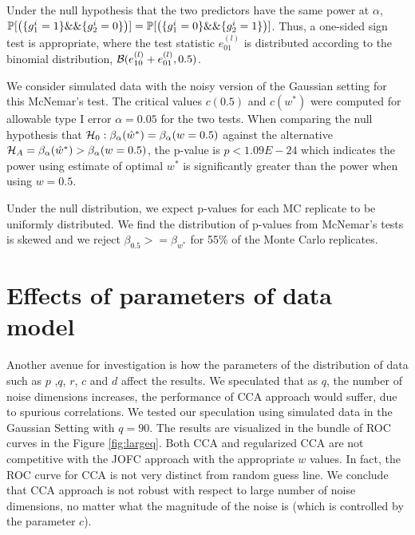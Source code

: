 \documentclass[12pt,oneside,final]{thesis}
\begin{document}
Under the null  hypothesis that the two predictors have the same power at $\alpha$,
 $\mathbb{P}[\left(\{g_1^{i}=1\} \&\& \{g_2^{i}=0\}\right)]=\mathbb{P}[\left(\{g_1^{i}=0\} \&\& \{g_2^{i}=1\}\right)]$. Thus, a one-sided sign test is appropriate,  where the test statistic $e_{01}^{(l)}$ is distributed according to  the binomial distribution, $\mathcal{B}(e_{10}^{(l)}+e_{01}^{(l)},0.5)$. 

We consider simulated data with the noisy version of the Gaussian setting for this McNemar's test. The critical values $c(0.5)$ and $c(w^*)$ were computed for  allowable type I error $\alpha=0.05$ for the two tests. When comparing  the null hypothesis that  $\mathcal{H}_{0}: \beta_{\alpha}({\hat{w}^*})=\beta_{\alpha}({w=0.5})$ against the alternative $\mathcal{H}_{A}=\beta_{\alpha}({\hat{w}^*})>\beta_{\alpha}({w=0.5})$, the p-value is $p<1.09E-24$ which indicates the power using estimate of optimal $w^*$ is significantly greater than the power when using $w=0.5$.

Under the null distribution, we expect p-values for each MC replicate to be uniformly distributed. We find
 the distribution of p-values from McNemar's tests  is skewed and  we reject $\beta_{0.5}>=\beta_{w^*} $ for  55\%  of the Monte Carlo replicates.

\section{Effects of parameters of data model }
 Another avenue for investigation is  how the parameters of the distribution of  data such as $p$ ,$q$, $r$, $c$ and $d$ affect the results. We speculated  that as $q$, the number of   noise dimensions increases, the performance of  CCA approach would suffer, due to spurious correlations. We tested  our speculation using simulated data in the Gaussian Setting with $q=90$. The results are visualized in the  bundle of ROC curves in the Figure \ref{fig:largeq}.  Both CCA and  regularized CCA are not competitive with the JOFC approach with the appropriate $w$ values. In fact, the ROC curve for CCA is not very distinct from  random guess line. We conclude that CCA approach is not robust with respect to large number of noise dimensions, no matter what the magnitude  of the noise  is (which is controlled by the parameter $c$).
\end{document}
